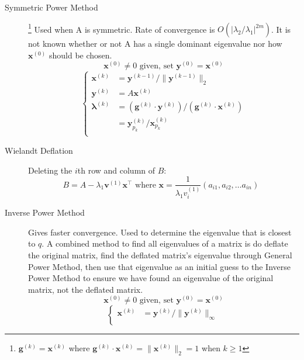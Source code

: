 \documentclass[8pt]{article}
\begin{document}
\begin{multicols}{2}
\begin{description}
  \item[Symmetric Power Method] \footnote{\label{ft:sympowmtd_g}$\mathbf{g}^{(k)} =
      \mathbf{x}^{(k)}$ where $\mathbf{g}^{(k)}\cdot\mathbf{x}^{(k)}=\|\mathbf{x}^{(k)}\|_2=1$ when $k \geq 1$} 
    Used when A is symmetric. Rate of convergence is $O(|\lambda_2/\lambda_1|^{2m})$. It is not
    known whether or not A has a single dominant eigenvalue nor how $\mathbf{x}^{(0)}$ should be chosen. 
    $$\mathbf{x}^{(0)} \neq 0 \text{ given, set } \mathbf{y}^{(0)}=\mathbf{x}^{(0)}$$
    \begin{equation*}
      \left\{
    \begin{aligned}
        \mathbf{x}^{(k)} &= \mathbf{y}^{(k-1)}/\|\mathbf{y}^{(k-1)}\|_2 \\
        \mathbf{y}^{(k)} &= A\mathbf{x}^{(k)} \\
        \boldsymbol{\lambda}^{(k)} &= (\mathbf{g}^{(k)} \cdot \mathbf{y}^{(k)})/(\mathbf{g}^{(k)} \cdot \mathbf{x}^{(k)}) \\
        &=\mathbf{y}^{(k)}_{p_k}/\mathbf{x}^{(k)}_{p_k} \\
      \end{aligned}
      \right.
    \end{equation*}
  \item[Wielandt Deflation] Deleting the $i$th row and column of $B$:
    \begin{equation*}
        B=A-\lambda_1\mathbf{v}^{(1)}\mathbf{x}^\top 
        \text{ where } \mathbf{x}=\frac{1}{\lambda_1 v^{(1)}_i}(a_{i1}, a_{i2}, \ldots a_{in}) 
        \text{ }
      \end{equation*}
  \item[Inverse Power Method] Gives faster convergence. Used to determine the eigenvalue that is
    closest to $q$. A combined method to find all eigenvalues of a matrix is do deflate the original
    matrix, find the deflated matrix's eigenvalue through General Power Method, then use that eigenvalue
    as an initial guess to the Inverse Power Method to ensure we have found an eigenvalue of the
    original matrix, not the deflated matrix.
    $$\mathbf{x}^{(0)} \neq 0 \text{ given, set } \mathbf{y}^{(0)}=\mathbf{x}^{(0)}$$
    \begin{equation*}
      \left\{
    \begin{aligned}
        \mathbf{x}^{(k)} &= \mathbf{y}^{(k)}/\|\mathbf{y}^{(k)}\|_\infty \\

\end{aligned}
\end{equation*}
\end{description}
\end{multicols}
\end{document}
